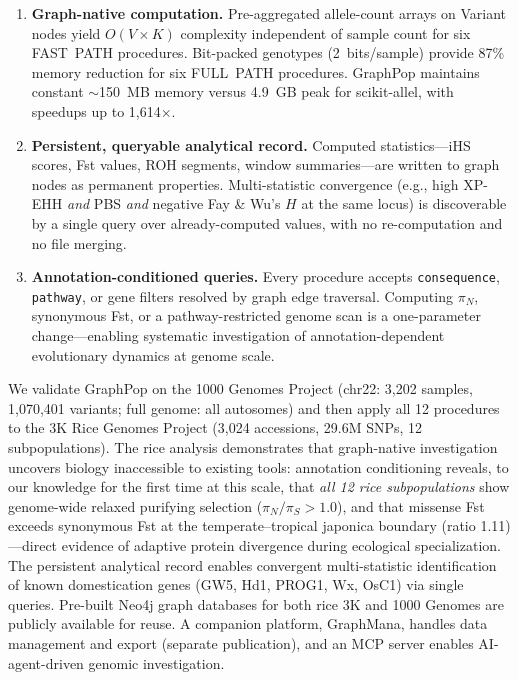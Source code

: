 \begin{enumerate}
\item \textbf{Graph-native computation.} Pre-aggregated allele-count arrays on Variant nodes yield $O(V \times K)$ complexity independent of sample count for six FAST~PATH procedures. Bit-packed genotypes (2~bits/sample) provide 87\% memory reduction for six FULL~PATH procedures. GraphPop maintains constant $\sim$150~MB memory versus 4.9~GB peak for scikit-allel, with speedups up to 1{,}614$\times$.

\item \textbf{Persistent, queryable analytical record.} Computed statistics---iHS scores, Fst values, ROH segments, window summaries---are written to graph nodes as permanent properties. Multi-statistic convergence (e.g., high XP-EHH \emph{and} PBS \emph{and} negative Fay \& Wu's $H$ at the same locus) is discoverable by a single query over already-computed values, with no re-computation and no file merging.

\item \textbf{Annotation-conditioned queries.} Every procedure accepts \texttt{consequence}, \texttt{pathway}, or gene filters resolved by graph edge traversal. Computing $\pi_N$, synonymous Fst, or a pathway-restricted genome scan is a one-parameter change---enabling systematic investigation of annotation-dependent evolutionary dynamics at genome scale.
\end{enumerate}

We validate GraphPop on the 1000 Genomes Project\cite{1000genomes2015global} (chr22: 3{,}202 samples, 1{,}070{,}401 variants; full genome: all autosomes) and then apply all 12 procedures to the 3K Rice Genomes Project\cite{wang2018genomic} (3{,}024 accessions, 29.6M SNPs, 12 subpopulations). The rice analysis demonstrates that graph-native investigation uncovers biology inaccessible to existing tools: annotation conditioning reveals, to our knowledge for the first time at this scale, that \emph{all 12 rice subpopulations} show genome-wide relaxed purifying selection ($\pi_N/\pi_S > 1.0$), and that missense Fst exceeds synonymous Fst at the temperate--tropical japonica boundary (ratio 1.11)---direct evidence of adaptive protein divergence during ecological specialization. The persistent analytical record enables convergent multi-statistic identification of known domestication genes (GW5, Hd1, PROG1, Wx, OsC1) via single queries. Pre-built Neo4j graph databases for both rice 3K and 1000 Genomes are publicly available for reuse. A companion platform, GraphMana, handles data management and export (separate publication), and an MCP server enables AI-agent-driven genomic investigation.
